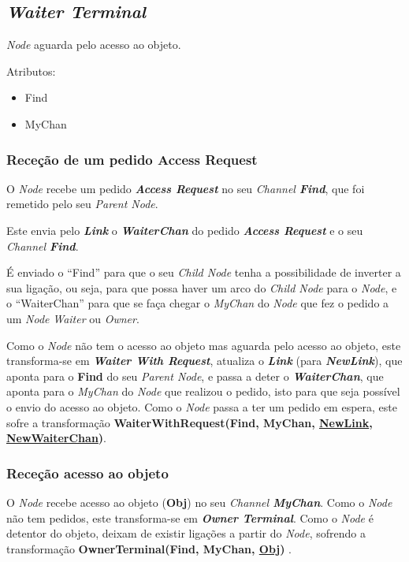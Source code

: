 \subsection*{\emph{Waiter Terminal}}
\label{especificacao:nodes:waiter_terminal}

\emph{Node} aguarda pelo acesso ao objeto.

Atributos:
\begin{itemize}
    \item Find
    \item MyChan
\end{itemize}

\subsubsection*{Receção de um pedido Access Request}
O \emph{Node} recebe um pedido \emph{\textbf{Access Request}} no seu \emph{Channel \textbf{Find}}, que foi remetido pelo seu \emph{Parent Node}.

Este envia pelo \textbf{\emph{Link}} o \textbf{\emph{WaiterChan}} do pedido \emph{\textbf{Access Request}} e o seu \emph{Channel \textbf{Find}}.

É enviado o ``Find'' para que o seu \emph{Child Node} tenha a possibilidade de inverter a sua ligação, ou seja, para que possa haver um arco do \emph{Child Node} para o \emph{Node}, 
e o ``WaiterChan'' para que se faça chegar o \emph{MyChan} do \emph{Node} que fez o pedido a um \emph{Node} \emph{Waiter} ou \emph{Owner}.


Como o \emph{Node} não tem o acesso ao objeto mas aguarda pelo acesso ao objeto, este transforma-se em \emph{\textbf{Waiter With Request}}, atualiza o \textbf{\emph{Link}} (para \textbf{\emph{NewLink}}),
que aponta para o \textbf{Find} do seu \emph{Parent Node}, 
e passa a deter o \textbf{\emph{WaiterChan}}, que aponta para o \emph{MyChan} do \emph{Node} que realizou o pedido, isto para que seja possível o envio do acesso ao objeto.
Como o \emph{Node} passa a ter um pedido em espera, este sofre a transformação \textbf{WaiterWithRequest(Find, MyChan, \underline{NewLink}, \underline{NewWaiterChan})}.


\subsubsection*{Receção acesso ao objeto}
O \emph{Node} recebe acesso ao objeto (\textbf{Obj}) no seu \emph{Channel \textbf{MyChan}}.
Como o \emph{Node} não tem pedidos, este transforma-se em \textbf{\emph{Owner Terminal}}.
Como o \emph{Node} é detentor do objeto, deixam de existir ligações a partir do \emph{Node}, sofrendo a transformação \textbf{ OwnerTerminal(Find, MyChan, \underline{Obj}) }.




